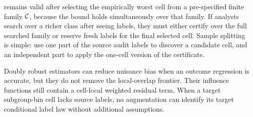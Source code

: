  remains valid after selecting the empirically worst cell from a pre-specified finite family \(\mathcal{C}\), because the bound holds simultaneously over that family. If analysts search over a richer class after seeing labels, they must either certify over the full searched family or reserve fresh labels for the final selected cell. Sample splitting is simple: use one part of the source audit labels to discover a candidate cell, and an independent part to apply the one-cell version of the certificate.

Doubly robust estimators can reduce nuisance bias when an outcome regression is accurate, but they do not remove the local-overlap frontier. Their influence functions still contain a cell-local weighted residual term. When a target subgroup-bin cell lacks source labels, no augmentation can identify its target conditional label law without additional assumptions.
